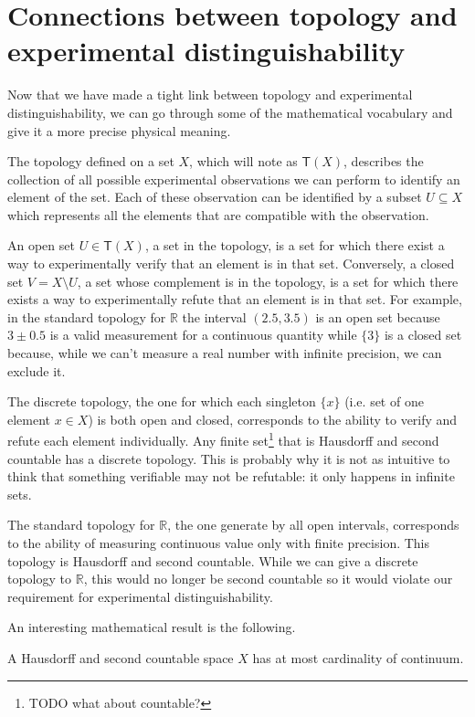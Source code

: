\documentclass[11pt,letterpaper,fleqn]{memoir} %
\begin{document}
\section{Connections between topology and experimental distinguishability}

Now that we have made a tight link between topology and experimental distinguishability, we can go through some of the mathematical vocabulary and give it a more precise physical meaning.

The topology defined on a set $X$, which will note as $\mathsf{T}(X)$, describes the collection of all possible experimental observations we can perform to identify an element of the set. Each of these observation can be identified by a subset $U \subseteq X$ which represents all the elements that are compatible with the observation.

An open set $U \in \mathsf{T}(X)$, a set in the topology, is a set for which there exist a way to  experimentally verify that an element is in that set. Conversely, a closed set $V = X \setminus U $, a set whose complement is in the topology, is a set for which there exists a way to experimentally refute that an element is in that set. For example, in the standard topology for $\mathbb{R}$ the interval $(2.5, 3.5)$ is an open set because $3 \pm 0.5$ is a valid measurement for a continuous quantity while $\{3\}$ is a closed set because, while we can't measure a real number with infinite precision, we can exclude it.

The discrete topology, the one for which each singleton $\{x\}$ (i.e. set of one element $x \in X$) is both open and closed, corresponds to the ability to verify and refute each element individually. Any finite set\footnote{TODO what about countable?} that is Hausdorff and second countable has a discrete topology. This is probably why it is not as intuitive to think that something verifiable may not be refutable: it only happens in infinite sets.

The standard topology for $\mathbb{R}$, the one generate by all open intervals, corresponds to the ability of measuring continuous value only with finite precision. This topology is Hausdorff and second countable. While we can give a discrete topology to $\mathbb{R}$, this would no longer be second countable so it would violate our requirement for experimental distinguishability.

An interesting mathematical result is the following.

\begin{prop}
	A Hausdorff and second countable space $X$ has at most cardinality of continuum.
\end{prop}
\end{document}
